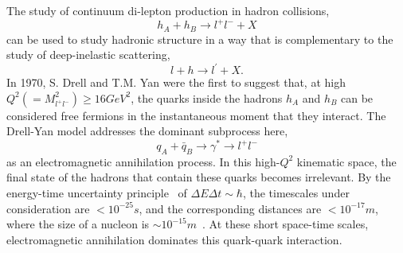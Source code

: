 The study of continuum di-lepton production in hadron collisions,
\begin{equation}
	h_A +  h_B \rightarrow l^+ l^- + X
	\label{eq:hh2ll}
\end{equation} 
can be used to study hadronic structure in a way that is complementary to the study of deep-inelastic scattering,
\begin{equation}
l + h \rightarrow l^\prime + X.
\label{eq:lh2lx}
\end{equation}
In 1970, S. Drell and T.M. Yan were the first to suggest that, at high $Q^2 (=M^2_{l^+ l^-}) \geq 16GeV^2$, the quarks inside the hadrons $h_A$ and $h_B$ can be considered free fermions in the instantaneous moment that they interact. The Drell-Yan model addresses the dominant subprocess here,
\begin{equation}
q_A + \bar{q}_B \rightarrow \gamma^* \rightarrow l^+ l^-
\label{eq:dy-process}
\end{equation} 
as an electromagnetic annihilation process. In this high-$Q^2$ kinematic space, the final state of the hadrons that contain these quarks becomes irrelevant. By the energy-time uncertainty principle~\cite{aHeisenberg:1927zz} of $\Delta E \Delta t \sim \hbar$, the timescales under consideration are $<10^{-25}s$, and the corresponding distances are $<10^{-17}m$, where the size of a nucleon is $\sim 10^{-15}m$~\cite{povh2002particles}. At these short space-time scales, electromagnetic annihilation dominates this quark-quark interaction.

